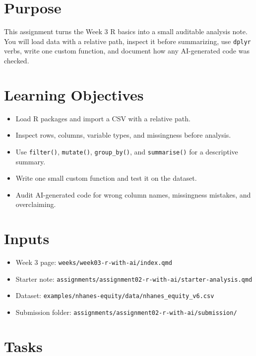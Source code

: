\documentclass[
  letterpaper,
  DIV=11,
  numbers=noendperiod,
  oneside]{scrreprt}
\providecommand{\tightlist}{%
  \setlength{\itemsep}{0pt}\setlength{\parskip}{0pt}}
\begin{document}
\section{Purpose}\label{purpose-4}

This assignment turns the Week 3 R basics into a small auditable
analysis note. You will load data with a relative path, inspect it
before summarizing, use \texttt{dplyr} verbs, write one custom function,
and document how any AI-generated code was checked.

\section{Learning Objectives}\label{learning-objectives-3}

\begin{itemize}
\tightlist
\item
  Load R packages and import a CSV with a relative path.
\item
  Inspect rows, columns, variable types, and missingness before
  analysis.
\item
  Use \texttt{filter()}, \texttt{mutate()}, \texttt{group\_by()}, and
  \texttt{summarise()} for a descriptive summary.
\item
  Write one small custom function and test it on the dataset.
\item
  Audit AI-generated code for wrong column names, missingness mistakes,
  and overclaiming.
\end{itemize}

\section{Inputs}\label{inputs-3}

\begin{itemize}
\tightlist
\item
  Week 3 page: \texttt{weeks/week03-r-with-ai/index.qmd}
\item
  Starter note:
  \texttt{assignments/assignment02-r-with-ai/starter-analysis.qmd}
\item
  Dataset: \texttt{examples/nhanes-equity/data/nhanes\_equity\_v6.csv}
\item
  Submission folder:
  \texttt{assignments/assignment02-r-with-ai/submission/}
\end{itemize}

\section{Tasks}\label{tasks-1}
\end{document}
